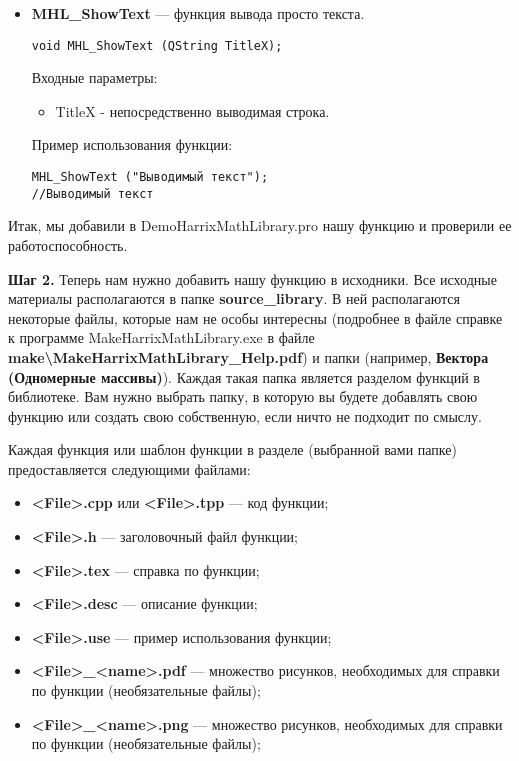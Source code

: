 \documentclass[a4paper,12pt]{article}
\begin{document}
\begin{itemize}
\item \textbf{MHL\_ShowText} --- функция вывода просто текста. 
\begin{lstlisting}[label=examplefunction14855, caption=Синтаксис функции MHL\_ShowText]
void MHL_ShowText (QString TitleX);
\end{lstlisting}
Входные параметры: 
\begin{itemize}   
     \item TitleX - непосредственно выводимая строка.
\end{itemize}
Пример использования функции:
\begin{lstlisting}[label=examplefunction14855, caption=Пример использования MHL\_ShowText]
MHL_ShowText ("Выводимый текст");
//Выводимый текст

\end{lstlisting}


\end{itemize}

Итак, мы добавили в DemoHarrixMathLibrary.pro нашу функцию и проверили ее работоспособность. 

\textbf{Шаг 2.}\label{step2} Теперь нам нужно добавить нашу функцию в исходники. Все исходные материалы располагаются в папке \textbf{source\_library}. В ней располагаются некоторые файлы, которые нам не особы интересны (подробнее в файле справке к программе MakeHarrixMathLibrary.exe в файле \textbf{make\textbackslash MakeHarrixMathLibrary\_Help.pdf}) и папки (например, \textbf{Вектора (Одномерные массивы)}). Каждая такая папка является разделом функций в библиотеке. Вам нужно выбрать папку, в которую вы будете добавлять свою функцию или создать свою собственную, если ничто не подходит по смыслу.

Каждая функция или шаблон функции в разделе (выбранной вами папке) предоставляется следующими файлами:
\begin{itemize}
\item \textbf{<File>.cpp} или \textbf{<File>.tpp} --- код функции;
\item \textbf{<File>.h} --- заголовочный файл функции;
\item \textbf{<File>.tex} --- справка по функции;
\item \textbf{<File>.desc} --- описание функции;
\item \textbf{<File>.use} --- пример использования функции;
\item \textbf{<File>\_<name>.pdf} --- множество рисунков, необходимых для справки по функции (необязательные файлы);
\item \textbf{<File>\_<name>.png} --- множество рисунков, необходимых для справки по функции (необязательные файлы);
\end{itemize}
\end{document}
